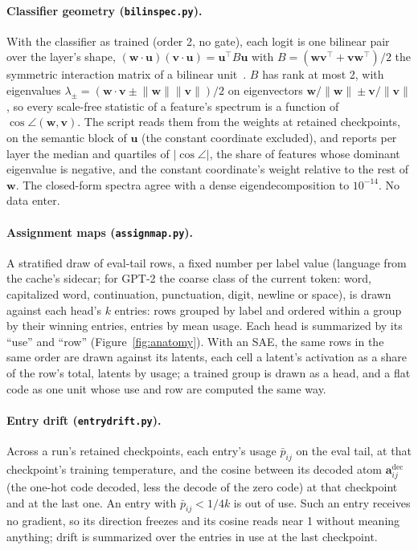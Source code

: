 \paragraph{Classifier geometry (\texttt{bilinspec.py}).}
With the classifier as trained (order 2, no gate), each logit is one
bilinear pair over the layer's shape,
$(\mathbf{w}\cdot\mathbf{u})(\mathbf{v}\cdot\mathbf{u}) =
\mathbf{u}^\top B\mathbf{u}$ with $B =
(\mathbf{w}\mathbf{v}^\top+\mathbf{v}\mathbf{w}^\top)/2$ the symmetric
interaction matrix of a bilinear unit~\cite{pearce2025}. $B$ has rank at
most 2, with eigenvalues $\lambda_\pm = (\mathbf{w}\cdot\mathbf{v} \pm
\lVert\mathbf{w}\rVert\lVert\mathbf{v}\rVert)/2$ on eigenvectors
$\mathbf{w}/\lVert\mathbf{w}\rVert \pm \mathbf{v}/\lVert\mathbf{v}\rVert$,
so every scale-free statistic of a feature's spectrum is a function of
$\cos\angle(\mathbf{w},\mathbf{v})$. The script reads them
from the weights at retained checkpoints, on the semantic block of
$\mathbf{u}$ (the constant coordinate excluded), and reports per layer the
median and quartiles of $\lvert\cos\angle\rvert$, the share of features whose
dominant eigenvalue is negative, and the constant coordinate's weight
relative to the rest of $\mathbf{w}$. The closed-form spectra agree with a
dense eigendecomposition to $10^{-14}$. No data enter.

\paragraph{Assignment maps (\texttt{assignmap.py}).}
A stratified draw of eval-tail rows, a fixed number per label value
(language from the cache's sidecar; for GPT-2 the coarse class of the
current token: word, capitalized word, continuation, punctuation, digit,
newline or space), is drawn against each head's $k$ entries: rows grouped
by label and ordered within a group by their winning entries, entries by
mean usage. Each head is summarized by its ``use'' and ``row''
(Figure~\ref{fig:anatomy}). With an SAE, the same rows in the same order
are drawn against its latents, each cell a latent's activation as a share
of the row's total, latents by usage; a trained group is drawn as a head,
and a flat code as one unit whose use and row are computed the same way.

\paragraph{Entry drift (\texttt{entrydrift.py}).}
Across a run's retained checkpoints, each entry's usage $\bar{p}_{ij}$ on
the eval tail, at that checkpoint's training temperature, and the cosine
between its decoded atom $\mathbf{a}^{\mathrm{dec}}_{ij}$ (the one-hot
code decoded, less the decode of the zero code) at that checkpoint and at
the last one. An entry with $\bar{p}_{ij} < 1/4k$ is out of use. Such an
entry receives no gradient, so its direction freezes and its cosine reads
near 1 without meaning anything; drift is summarized over the entries in
use at the last checkpoint.

